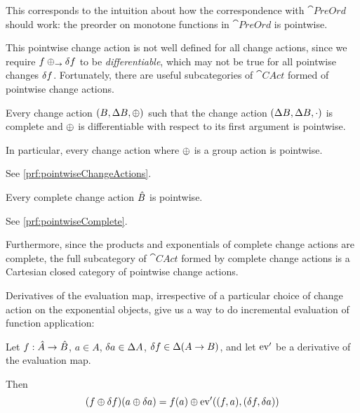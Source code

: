This corresponds to the intuition about how the correspondence with
$\cat{PreOrd}$ should work: the preorder on monotone functions in $\cat{PreOrd}$ is
pointwise.

This pointwise change action is not well defined for all change actions, since
we require $f \oplus_\rightarrow \delta f$ to be \emph{differentiable}, which
may not be true for all pointwise changes $\delta f$.
Fortunately, there are useful subcategories of $\cat{CAct}$ formed of pointwise change actions.

\begin{prop}[name=Pointwise change actions, restate=pointwiseChangeActions]
  \label{prop:pointwiseChangeActions}
  Every change action $(B,\Delta B,\oplus)$ such that the change action
  $(\Delta B,\Delta B,\cdot)$ is complete and $\oplus$ is differentiable with
  respect to its first argument is pointwise.

  In particular, every change action where $\oplus$ is a group action is pointwise.
\end{prop}
\ifproofs
  See \cref{prf:pointwiseChangeActions}.
\fi

\begin{prop}[name=Complete implies pointwise, restate=pointwiseComplete]
  \label{prop:pointwiseComplete}
   Every complete change action $\hat{B}$ is pointwise.
\end{prop}
\ifproofs
  See \cref{prf:pointwiseComplete}.
\fi

Furthermore, since the products and exponentials of complete change actions are complete,
the full subcategory of $\cat{CAct}$ formed by complete change actions is a Cartesian
closed category of pointwise change actions.


Derivatives of the evaluation map, irrespective of a particular choice of change action on the
exponential objects, give us a way to do incremental evaluation of function application:
\begin{prop}
\label{prop:incrementalization}
  Let $f: \hat{A} \rightarrow \hat{B}$, $a \in A$, $\delta a \in
  \Delta A$, $\delta f \in \Delta (A \rightarrow B)$, and let
  $\operatorname{ev}'$ be a derivative of the evaluation map.

  Then
  \begin{displaymath}
    (f \oplus \delta f)(a \oplus \delta a) = f(a) \oplus \operatorname{ev}'((f, a), (\delta f, \delta a))
  \end{displaymath}
\end{prop}

